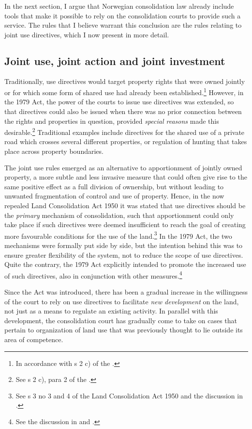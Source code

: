 In the next section, I argue that Norwegian consolidation law already include tools that make it possible to rely on the consolidation courts to provide such a service. The rules that I believe warrant this conclusion are the rules relating to joint use directives, which I now present in more detail.

\subsection{Joint use, joint action and joint investment}\label{sec:3}

Traditionally, use directives would target property rights that were owned jointly or for which some form of shared use had already been established.\footnote{In accordance with s 2 c) of the \cite{lca79} .} However, in the 1979 Act, the power of the courts to issue use directives was extended, so that directives could also be issued when there was no prior connection between the rights and properties in question, provided \emph{special reasons} made this desirable.\footnote{See s 2 c), para 2 of the \cite{lca79}.} Traditional examples include directives for the shared use of a private road which crosses several different properties, or regulation of hunting that takes place across property boundaries.

The joint use rules emerged as an alternative to apportionment of jointly owned property, a more subtle and less invasive measure that could often give rise to the same positive effect as a full division of ownership, but without leading to unwanted fragmentation of control and use of property. Hence, in the now repealed Land Consolidation Act 1950 it was stated that use directives should be the \emph{primary} mechanism of consolidation, such that apportionment could only take place if such directives were deemed insufficient to reach the goal of creating more favourable conditions for the use of the land.\footnote{See s 3 no 3 and 4 of the Land Consolidation Act 1950 and the discussion in \cite[30-37]{nou76}.} In the 1979 Act, the two mechanisms were formally put side by side, but the intention behind this was to ensure greater flexibility of the system, not to reduce the scope of use directives. Quite the contrary, the 1979 Act explicitly intended to promote the increased use of such directives, also in conjunction with other measures.\footnote{See the discussion in \cite[35-37]{nou76} and \cite[47-48]{otprp56}.}

Since the Act was introduced, there has been a gradual increase in the willingness of the court to rely on use directives to facilitate \emph{new development} on the land, not just as a means to regulate an existing activity. In parallel with this development, the consolidation court has gradually come to take on cases that pertain to organization of land use that was previously thought to lie outside its area of competence. 


